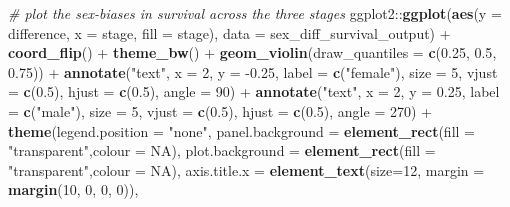 \documentclass[]{article}
\newenvironment{Shaded}{\begin{snugshade}}{\end{snugshade}}
\newcommand{\KeywordTok}[1]{\textcolor[rgb]{0.13,0.29,0.53}{\textbf{{#1}}}}
\newcommand{\DataTypeTok}[1]{\textcolor[rgb]{0.13,0.29,0.53}{{#1}}}
\newcommand{\DecValTok}[1]{\textcolor[rgb]{0.00,0.00,0.81}{{#1}}}
\newcommand{\FloatTok}[1]{\textcolor[rgb]{0.00,0.00,0.81}{{#1}}}
\newcommand{\StringTok}[1]{\textcolor[rgb]{0.31,0.60,0.02}{{#1}}}
\newcommand{\CommentTok}[1]{\textcolor[rgb]{0.56,0.35,0.01}{\textit{{#1}}}}
\newcommand{\OtherTok}[1]{\textcolor[rgb]{0.56,0.35,0.01}{{#1}}}
\newcommand{\NormalTok}[1]{{#1}}
\begin{document}
\begin{Shaded}
\begin{Highlighting}[]
{{\CommentTok{# plot the sex-biases in survival across the three stages}
\NormalTok{ggplot2::}\KeywordTok{ggplot}\NormalTok{(}\KeywordTok{aes}\NormalTok{(}\DataTypeTok{y =} \NormalTok{difference, }\DataTypeTok{x =} \NormalTok{stage, }\DataTypeTok{fill =} \NormalTok{stage), }
                \DataTypeTok{data =} \NormalTok{sex_diff_survival_output) +}\StringTok{ }
\StringTok{                }\KeywordTok{coord_flip}\NormalTok{() +}
\StringTok{                }\KeywordTok{theme_bw}\NormalTok{() +}
\StringTok{                }\KeywordTok{geom_violin}\NormalTok{(}\DataTypeTok{draw_quantiles =} \KeywordTok{c}\NormalTok{(}\FloatTok{0.25}\NormalTok{, }\FloatTok{0.5}\NormalTok{, }\FloatTok{0.75}\NormalTok{)) +}
\StringTok{                }\KeywordTok{annotate}\NormalTok{(}\StringTok{"text"}\NormalTok{, }\DataTypeTok{x =} \DecValTok{2}\NormalTok{, }\DataTypeTok{y =} \NormalTok{-}\FloatTok{0.25}\NormalTok{,}
                         \DataTypeTok{label =} \KeywordTok{c}\NormalTok{(}\StringTok{"female"}\NormalTok{), }\DataTypeTok{size =} \DecValTok{5}\NormalTok{,}
                         \DataTypeTok{vjust =} \KeywordTok{c}\NormalTok{(}\FloatTok{0.5}\NormalTok{), }\DataTypeTok{hjust =} \KeywordTok{c}\NormalTok{(}\FloatTok{0.5}\NormalTok{), }\DataTypeTok{angle =} \DecValTok{90}\NormalTok{) +}
\StringTok{                }\KeywordTok{annotate}\NormalTok{(}\StringTok{"text"}\NormalTok{, }\DataTypeTok{x =} \DecValTok{2}\NormalTok{, }\DataTypeTok{y =} \FloatTok{0.25}\NormalTok{,}
                         \DataTypeTok{label =} \KeywordTok{c}\NormalTok{(}\StringTok{"male"}\NormalTok{), }\DataTypeTok{size =} \DecValTok{5}\NormalTok{,}
                         \DataTypeTok{vjust =} \KeywordTok{c}\NormalTok{(}\FloatTok{0.5}\NormalTok{), }\DataTypeTok{hjust =} \KeywordTok{c}\NormalTok{(}\FloatTok{0.5}\NormalTok{), }\DataTypeTok{angle =} \DecValTok{270}\NormalTok{) +}
\StringTok{                }\KeywordTok{theme}\NormalTok{(}\DataTypeTok{legend.position =} \StringTok{"none"}\NormalTok{,}
                      \DataTypeTok{panel.background =} \KeywordTok{element_rect}\NormalTok{(}\DataTypeTok{fill =} \StringTok{"transparent"}\NormalTok{,}\DataTypeTok{colour =} \OtherTok{NA}\NormalTok{),}
                      \DataTypeTok{plot.background =} \KeywordTok{element_rect}\NormalTok{(}\DataTypeTok{fill =} \StringTok{"transparent"}\NormalTok{,}\DataTypeTok{colour =} \OtherTok{NA}\NormalTok{),}
                      \DataTypeTok{axis.title.x =} \KeywordTok{element_text}\NormalTok{(}\DataTypeTok{size=}\DecValTok{12}\NormalTok{, }\DataTypeTok{margin =} \KeywordTok{margin}\NormalTok{(}\DecValTok{10}\NormalTok{, }\DecValTok{0}\NormalTok{, }\DecValTok{0}\NormalTok{, }\DecValTok{0}\NormalTok{)),}
}}
\end{Highlighting}
\end{Shaded}
\end{document}
